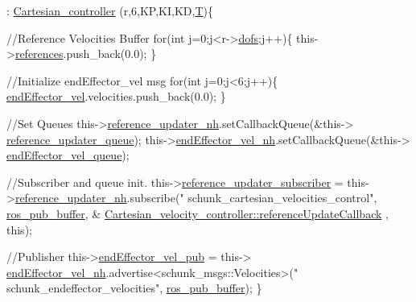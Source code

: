 \begin{DoxyCode}
                                                                               
                                            : \hyperlink{classCartesian__controller_a71055bb1cbf01ced9e64bb1d184b68fe}{Cartesian\_controller}
      (r,6,KP,KI,KD,\hyperlink{classCartesian__controller_a35c6ddbb9624878f2807ff644a33e832}{T})\{

        \textcolor{comment}{//Reference Velocities Buffer}
        \textcolor{keywordflow}{for}(\textcolor{keywordtype}{int} j=0;j<r->\hyperlink{structRobot_a51d4a86ac5314a1ed8614d5664c80747}{dofs};j++)\{
                this->\hyperlink{classCartesian__velocity__controller_afc3792f1f6dd0025417d752a89e519e1}{references}.push\_back(0.0);
        \}

        \textcolor{comment}{//Initialize endEffector\_vel msg}
        \textcolor{keywordflow}{for}(\textcolor{keywordtype}{int} j=0;j<6;j++)\{
                \hyperlink{classCartesian__velocity__controller_ae771d963a90ad7b844c4c3a821ce5f39}{endEffector\_vel}.velocities.push\_back(0.0);
        \}

        \textcolor{comment}{//Set Queues}
        this->\hyperlink{classCartesian__velocity__controller_a7d04d378a2a6d19870a620883dcd3e09}{reference\_updater\_nh}.setCallbackQueue(&this->
      \hyperlink{classCartesian__velocity__controller_ad2804cf83a42305d18572abdbbfd1c3f}{reference\_updater\_queue});
        this->\hyperlink{classCartesian__velocity__controller_a01cbe7f951c69ded8604e552a0a706e0}{endEffector\_vel\_nh}.setCallbackQueue(&this->
      \hyperlink{classCartesian__velocity__controller_af154b0cda931081b52224eb22e4680f7}{endEffector\_vel\_queue});

        \textcolor{comment}{//Subscriber and queue init.}
        this->\hyperlink{classCartesian__velocity__controller_a75412b9859afe4b800f9613c9cb8d17f}{reference\_updater\_subscriber}  = 
      this->\hyperlink{classCartesian__velocity__controller_a7d04d378a2a6d19870a620883dcd3e09}{reference\_updater\_nh}.subscribe(\textcolor{stringliteral}{"
      schunk\_cartesian\_velocities\_control"}, \hyperlink{classCartesian__controller_ab9ed5a808da204dbc612d313dc7332f4}{ros\_pub\_buffer}, &
      \hyperlink{classCartesian__velocity__controller_a2f020f22b2e63da5afeff3f083e4095c}{Cartesian\_velocity\_controller::referenceUpdateCallback}
      , \textcolor{keyword}{this});

        \textcolor{comment}{//Publisher}
        this->\hyperlink{classCartesian__velocity__controller_ab12287816ae785d3cd6243b3df0cffc6}{endEffector\_vel\_pub}   = this->
      \hyperlink{classCartesian__velocity__controller_a01cbe7f951c69ded8604e552a0a706e0}{endEffector\_vel\_nh}.advertise<schunk\_msgs::Velocities>(\textcolor{stringliteral}{"
      schunk\_endeffector\_velocities"}, \hyperlink{classCartesian__controller_ab9ed5a808da204dbc612d313dc7332f4}{ros\_pub\_buffer});
\}
\end{DoxyCode}


